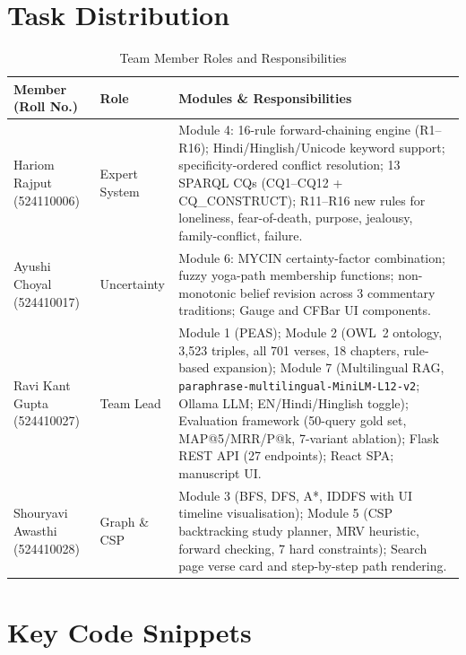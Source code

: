 \documentclass[conference]{IEEEtran}
\begin{document}
\appendices

\section{Task Distribution}

\begin{table}[htbp]
\caption{Team Member Roles and Responsibilities}
\label{tab:tasks}
\centering
\small
\begin{tabular}{p{2.5cm}p{1.8cm}p{10.6cm}}
\toprule
\textbf{Member (Roll No.)} & \textbf{Role} & \textbf{Modules \& Responsibilities} \\
\midrule
Hariom Rajput \newline (524110006)
  & Expert System
  & Module 4: 16-rule forward-chaining engine (R1--R16); Hindi/Hinglish/Unicode keyword support; specificity-ordered conflict resolution; 13 SPARQL CQs (CQ1--CQ12 + CQ\_CONSTRUCT); R11--R16 new rules for loneliness, fear-of-death, purpose, jealousy, family-conflict, failure. \\
\midrule
Ayushi Choyal \newline (524410017)
  & Uncertainty
  & Module 6: MYCIN certainty-factor combination; fuzzy yoga-path membership functions; non-monotonic belief revision across 3 commentary traditions; Gauge and CFBar UI components. \\
\midrule
Ravi Kant Gupta \newline (524410027)
  & Team Lead
  & Module 1 (PEAS); Module 2 (OWL~2 ontology, 3,523 triples, all 701 verses, 18 chapters, rule-based expansion); Module 7 (Multilingual RAG, \texttt{paraphrase-multilingual-MiniLM-L12-v2}; Ollama LLM; EN/Hindi/Hinglish toggle); Evaluation framework (50-query gold set, MAP@5/MRR/P@k, 7-variant ablation); Flask REST API (27 endpoints); React SPA; manuscript UI. \\
\midrule
Shouryavi Awasthi \newline (524410028)
  & Graph \& CSP
  & Module 3 (BFS, DFS, A*, IDDFS with UI timeline visualisation); Module 5 (CSP backtracking study planner, MRV heuristic, forward checking, 7 hard constraints); Search page verse card and step-by-step path rendering. \\
\bottomrule
\end{tabular}
\end{table}

\section{Key Code Snippets}
\end{document}
